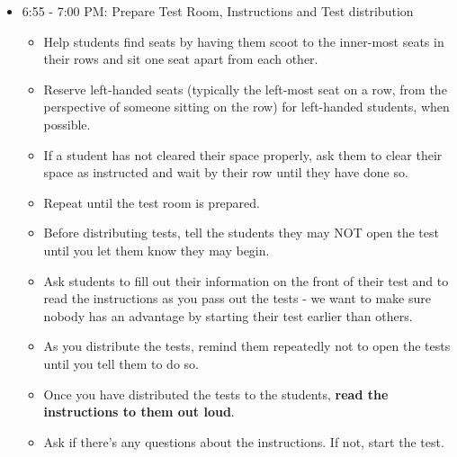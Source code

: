 \documentclass[11pt]{article}
\begin{document}
\begin{itemize}
\begin{itemize}
    \end{itemize}
    
\item 6:55 - 7:00 PM: Prepare Test Room, Instructions and Test distribution
    \begin{itemize}
    \item Help students find seats by having them scoot to the inner-most seats in their rows and sit one seat apart from each other.
    \item Reserve left-handed seats (typically the left-most seat on a row, from the perspective of someone sitting on the row) for left-handed students, when possible.
    \item If a student has not cleared their space properly, ask them to clear their space as instructed and wait by their row until they have done so.
    \item Repeat until the test room is prepared.
    \item Before distributing tests, tell the students they may NOT open the test until you let them know they may begin.
    \item Ask students to fill out their information on the front of their test and to read the instructions as you pass out the tests - we want to make sure nobody has an advantage by starting their test earlier than others.
    \item As you distribute the tests, remind them repeatedly not to open the tests until you tell them to do so.
    \item Once you have distributed the tests to the students, {\bf read the instructions to them out loud}.
    \item Ask if there's any questions about the instructions. If not, start the test.
    \end{itemize}
    

\end{itemize}
\end{document}

